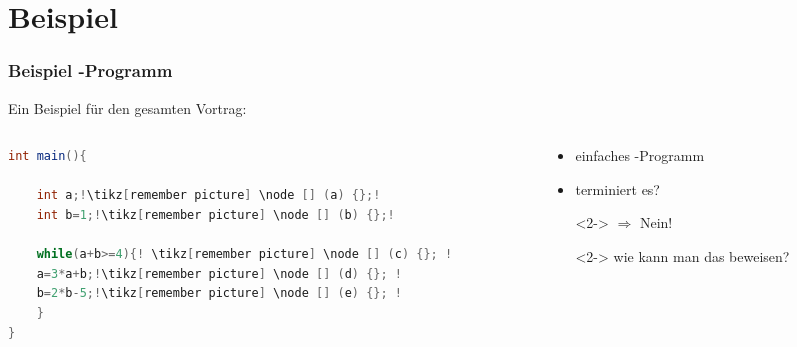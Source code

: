 \section{Beispiel}
\frame{\tableofcontents[currentsection]}

\begin{frame}[fragile] %
  \frametitle{Beispiel -Programm} %
  Ein Beispiel f\"ur den gesamten Vortrag:
  \begin{columns}
  	\begin{column}{6cm}
  		\begin{lstlisting}[language = java,escapechar = !]
int main(){
  		
	int a;!\tikz[remember picture] \node [] (a) {};!
	int b=1;!\tikz[remember picture] \node [] (b) {};!
  		
	while(a+b>=4){! \tikz[remember picture] \node [] (c) {}; !
    a=3*a+b;!\tikz[remember picture] \node [] (d) {}; !
    b=2*b-5;!\tikz[remember picture] \node [] (e) {}; !
	}
}		
  		\end{lstlisting}
%  		
%  		
  	\end{column}
	\begin{column}{5cm}
		\begin{itemize}			
			\item einfaches -Programm
			\item terminiert es?
			\item[]<2-> $\Rightarrow$ \color{red}Nein!\color{black}
			\item[]<2-> wie kann man das beweisen?
		\end{itemize}
	\end{column}
  \end{columns}
\end{frame}